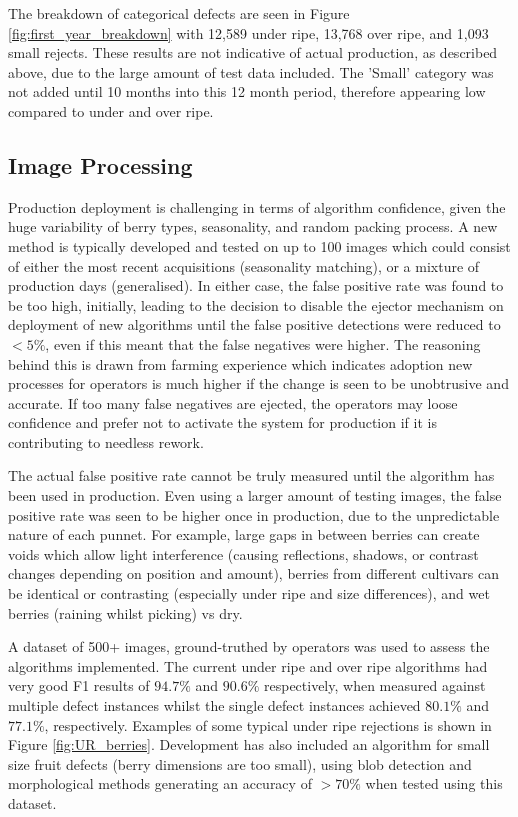 \documentclass[fleqn,twoside,12pt]{report}
\begin{document}
The breakdown of categorical defects are seen in Figure \ref{fig:first_year_breakdown} with 12,589 under ripe, 13,768 over ripe, and 1,093 small rejects. These results are not indicative of actual production, as described above, due to the large amount of test data included. The 'Small' category was not added until 10 months into this 12 month period, therefore appearing low compared to under and over ripe. 



\subsection{Image Processing}

Production deployment is challenging in terms of algorithm confidence, given the huge variability of berry types, seasonality, and random packing process. A new method is typically developed and tested on up to 100 images which could consist of either the most recent acquisitions (seasonality matching), or a mixture of production days (generalised). In either case, the false positive rate was found to be too high, initially, leading to the decision to disable the ejector mechanism on deployment of new algorithms until the false positive detections were reduced to $<5\%$, even if this meant that the false negatives were higher. The reasoning behind this is drawn from farming experience which indicates adoption new processes for operators is much higher if the change is seen to be unobtrusive and accurate. If too many false negatives are ejected, the operators may loose confidence and prefer not to activate the system for production if it is contributing to needless rework.

The actual false positive rate cannot be truly measured until the algorithm has been used in production. Even using a larger amount of testing images, the false positive rate was seen to be higher once in production, due to the unpredictable nature of each punnet. For example, large gaps in between berries can create voids which allow light interference (causing reflections, shadows, or contrast changes depending on position and amount), berries from different cultivars can be identical or contrasting (especially under ripe and size differences), and wet berries (raining whilst picking) vs dry.


A dataset of 500+ images, ground-truthed by operators was used to assess the algorithms implemented. The current under ripe  and over ripe algorithms had very good F1 results of $94.7\%$ and $90.6\%$ respectively, when measured against multiple defect instances whilst the single defect instances achieved $80.1\%$ and $77.1\%$, respectively. Examples of some typical under ripe rejections is shown in Figure \ref{fig:UR_berries}. Development has also included an algorithm for small size fruit defects (berry dimensions are too small), using blob detection and morphological methods generating an accuracy of $>70\%$ when tested using this dataset.
\end{document}
